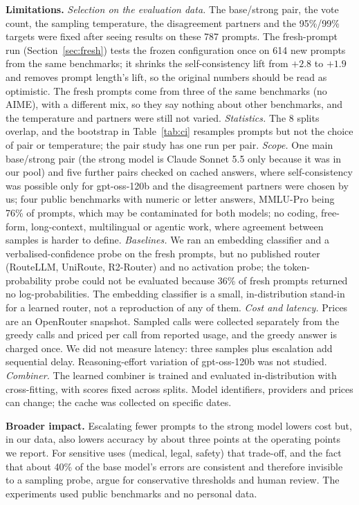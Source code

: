 \documentclass[11pt]{article}
\begin{document}
\textbf{Limitations.} \emph{Selection on the evaluation data.} The base/strong pair, the vote count, the sampling temperature, the disagreement partners and the 95\%/99\% targets were fixed after seeing results on these 787 prompts. The fresh-prompt run (Section~\ref{sec:fresh}) tests the frozen configuration once on 614 new prompts from the same benchmarks; it shrinks the self-consistency lift from $+2.8$ to $+1.9$ and removes prompt length's lift, so the original numbers should be read as optimistic. The fresh prompts come from three of the same benchmarks (no AIME), with a different mix, so they say nothing about other benchmarks, and the temperature and partners were still not varied. \emph{Statistics.} The 8 splits overlap, and the bootstrap in Table~\ref{tab:ci} resamples prompts but not the choice of pair or temperature; the pair study has one run per pair. \emph{Scope.} One main base/strong pair (the strong model is Claude Sonnet 5.5 only because it was in our pool) and five further pairs checked on cached answers, where self-consistency was possible only for gpt-oss-120b and the disagreement partners were chosen by us; four public benchmarks with numeric or letter answers, MMLU-Pro being 76\% of prompts, which may be contaminated for both models; no coding, free-form, long-context, multilingual or agentic work, where agreement between samples is harder to define. \emph{Baselines.} We ran an embedding classifier and a verbalised-confidence probe on the fresh prompts, but no published router (RouteLLM, UniRoute, R2-Router) and no activation probe; the token-probability probe could not be evaluated because 36\% of fresh prompts returned no log-probabilities. The embedding classifier is a small, in-distribution stand-in for a learned router, not a reproduction of any of them. \emph{Cost and latency.} Prices are an OpenRouter snapshot. Sampled calls were collected separately from the greedy calls and priced per call from reported usage, and the greedy answer is charged once. We did not measure latency: three samples plus escalation add sequential delay. Reasoning-effort variation of gpt-oss-120b was not studied. \emph{Combiner.} The learned combiner is trained and evaluated in-distribution with cross-fitting, with scores fixed across splits. Model identifiers, providers and prices can change; the cache was collected on specific dates.

\textbf{Broader impact.} Escalating fewer prompts to the strong model lowers cost but, in our data, also lowers accuracy by about three points at the operating points we report. For sensitive uses (medical, legal, safety) that trade-off, and the fact that about 40\% of the base model's errors are consistent and therefore invisible to a sampling probe, argue for conservative thresholds and human review. The experiments used public benchmarks and no personal data.
\end{document}
